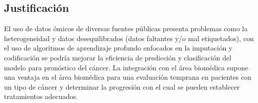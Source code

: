 \subsection{Justificación}

El uso de datos ómicos de diversas fuentes públicas presenta problemas como la heterogeneidad y datos desequilibrados (datos faltantes y/o mal etiquetados), con el uso de algoritmos de aprendizaje profundo enfocados en la imputación y codificación se podría mejorar la eficiencia de predicción y clasificación del modelo para pronóstico del cáncer. La integración con el área biomédica supone una ventaja en el área biomédica para una evaluación temprana en pacientes con un tipo de cáncer y determinar la progresión con el cual se pueden establecer tratamientos adecuados.